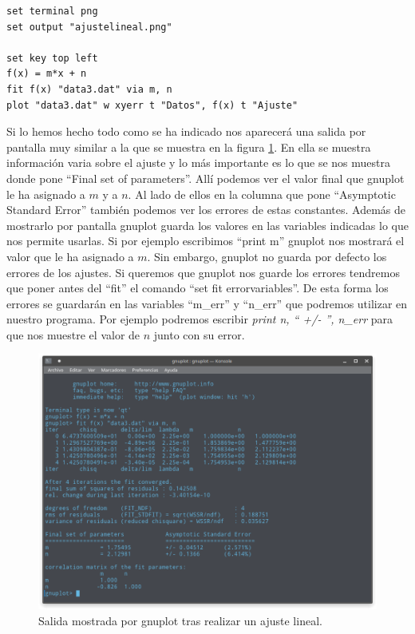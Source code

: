 \documentclass[11pt,a4paper,twoside,pdf]{article}
\numberwithin{equation}{section}
\begin{document}
\begin{lstlisting}[language=Gnuplot]
set terminal png
set output "ajustelineal.png"

set key top left
f(x) = m*x + n
fit f(x) "data3.dat" via m, n
plot "data3.dat" w xyerr t "Datos", f(x) t "Ajuste"
\end{lstlisting}

Si lo hemos hecho todo como se ha indicado nos aparecerá una salida por pantalla muy similar a la que se muestra en la figura \ref{fig:OutputFit}. En ella se muestra información varia sobre el ajuste y lo más importante es lo que se nos muestra donde pone ``Final set of parameters''. Allí podemos ver el valor final que gnuplot le ha asignado a $m$ y a $n$. Al lado de ellos en la columna que pone ``Asymptotic Standard Error'' también podemos ver los errores de estas constantes. Además de mostrarlo por pantalla gnuplot guarda los valores en las variables indicadas lo que nos permite usarlas. Si por ejemplo escribimos ``print m'' gnuplot nos mostrará el valor que le ha asignado a $m$. Sin embargo, gnuplot no guarda por defecto los errores de los ajustes. Si queremos que gnuplot nos guarde los errores tendremos que poner antes del ``fit'' el comando ``set fit errorvariables''. De esta forma los errores se guardarán en las variables ``m\_err'' y ``n\_err'' que podremos utilizar en nuestro programa. Por ejemplo podremos escribir \textit{print n, `` +/- '', n\_err} para que nos muestre el valor de $n$ junto con su error.\\

\begin{figure}[h]
	\centering
	\includegraphics[scale=0.4]{Capturas/02_SalidaFit.png}
	\caption{Salida mostrada por gnuplot tras realizar un ajuste lineal.}
	\label{fig:OutputFit}
\end{figure}
\end{document}
